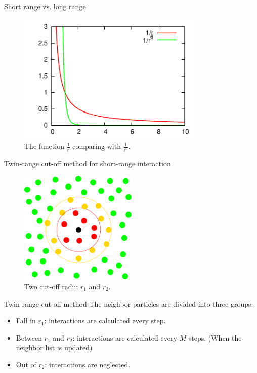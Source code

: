\documentclass{beamer}
\newcommand{\redc}[1]{{\color{red} #1}}
\newcommand{\yellowc}[1]{{\color{myyellow} #1}}
\newcommand{\greenc}[1]{{\color{green} #1}}
\begin{document}
\begin{frame}{Short range vs. long range}
  \begin{figure}
    \centering 
    \includegraphics[width=0.8\textwidth]{figs/long-range/decay.pdf}
    \\{The function $\frac1r$ comparing with $\frac1{r^6}$. }
  \end{figure}
\end{frame}

\begin{frame}{Twin-range cut-off method for short-range interaction}
  \begin{figure}
    \centering 
    \includegraphics[width=0.5\textwidth]{figs/short-range//neighbor.pdf}
    \caption{Two cut-off radii: \redc{$r_1$} and \yellowc{$r_2$}.}
  \end{figure}
\end{frame}

\begin{frame}{Twin-range cut-off method}
  \vfill
  The neighbor particles are divided into three groups.
  \begin{itemize}
  \vfill
  \item \redc{Fall in $r_1$}: interactions are calculated every step.
  \vfill
  \item \yellowc{Between $r_1$ and $r_2$}: interactions are calculated every $M$
    steps. (When the neighbor list is updated)
  \vfill
  \item \greenc{Out of $r_2$}: interactions are neglected.
  \vfill
  \end{itemize}
\end{frame}
\end{document}

